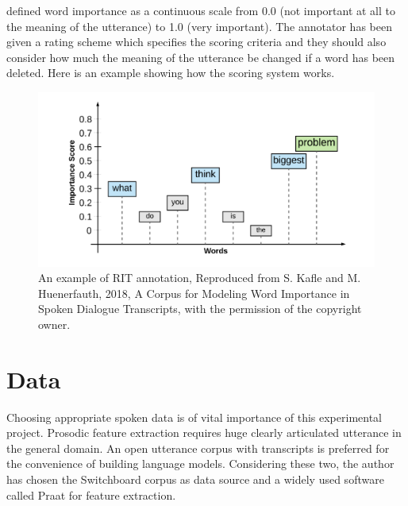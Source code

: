 \citet{Kafle2018} defined word importance as a continuous scale from 0.0 (not important
at all to the meaning of the utterance) to 1.0 (very important). The annotator has been given a rating scheme which specifies the scoring criteria and they should also consider how much the meaning of the utterance be changed if a word has been deleted. Here is an example showing how the scoring system works.

\begin{figure}[ht]
\includegraphics[width=15cm]{figures/word.png}
\caption{An example of RIT annotation, Reproduced from S. Kafle and M. Huenerfauth, 2018, A Corpus for Modeling Word Importance in Spoken Dialogue Transcripts, with the permission of the copyright owner.}
\label{fig:word}
\end{figure}



%
%


\section{Data}
Choosing appropriate spoken data is of vital importance of this experimental project. Prosodic feature extraction requires huge clearly articulated utterance in the general domain. An open utterance corpus with transcripts is preferred for the convenience of building language models. Considering these two, the author has chosen the Switchboard corpus as data source and a widely used software called Praat for feature extraction.

